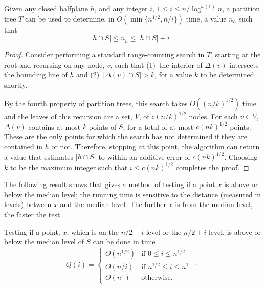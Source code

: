 \documentclass{cccg12}
\newcommand{\eps}{\varepsilon}
\begin{document}
\begin{lem}
  Given any closed halfplane $h$, and any integer $i$, $1\le i\le
  n/\log^{\omega(1)} n$, a partition tree $T$ can be used to determine,
  in $O(\min\{n^{1/2},n/i\})$ time, a value $n_h$ such that 
  \[ |h\cap S| \le n_h \le |h\cap S|+i \enspace .\]
\end{lem}

\begin{proof}
  Consider performing a standard range-counting  search in $T$, starting
  at the root and recursing on any node, $v$, such that (1)~the
  interior of $\Delta(v)$ intersects the bounding line of $h$ and
  (2)~$|\Delta(v)\cap S| > k$, for a value $k$ to be determined shortly.

  By the fourth property of partition trees, this search takes
  $O((n/k)^{1/2})$ time and the leaves of this recursion are a set, $V$,
  of $c(n/k)^{1/2}$ nodes.  For each $v\in V$, $\Delta(v)$ contains at
  most $k$ points of $S$, for a total of at most $c(nk)^{1/2}$ points.
  These are the only points for which the search has not determined if
  they are contained in $h$ or not.  Therefore, stopping at this point,
  the algorithm can return a value that estimates $|h\cap S|$ to within
  an additive error of $c(nk)^{1/2}$.  Choosing $k$ to be the maximum
  integer such that $i \le c(nk)^{1/2}$ completes the proof.
\end{proof}

%

The following result shows that  gives a method of
testing if a point $x$ is above or below the median level; the running
time is sensitive to the distance (measured in levels) between $x$ and
the median level.  The further $x$ is from the median level, the faster
the test.

\begin{lem}
  Testing if a point, $x$, which is on the $n/2-i$ level or the $n/2+i$
  level, is above or below the median level of $S$ can be done in time
  \[
       Q(i) = \begin{cases}
          O(n^{1/2}) & \text{if $0\le i \le n^{1/2}$} \\
          O(n/i)      & \text{if $n^{1/2} \le i \le n^{1-\eps}$} \\
          O(n^{\eps}) & \text{otherwise.}
       \end{cases}
  \]
\end{lem}
\end{document}
